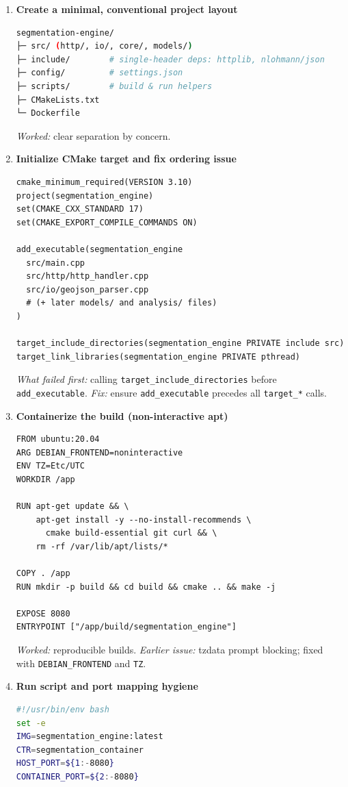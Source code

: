 \documentclass[11pt,twoside]{report}
\begin{document}
\begin{enumerate}
	\item \textbf{Create a minimal, conventional project layout}
	      \begin{lstlisting}[language=bash]
segmentation-engine/
├─ src/ (http/, io/, core/, models/)
├─ include/        # single-header deps: httplib, nlohmann/json
├─ config/         # settings.json
├─ scripts/        # build & run helpers
├─ CMakeLists.txt
└─ Dockerfile
    \end{lstlisting}
	      \subitem \textit{Worked:} clear separation by concern.

	\item \textbf{Initialize CMake target and fix ordering issue}
	      \begin{lstlisting}
cmake_minimum_required(VERSION 3.10)
project(segmentation_engine)
set(CMAKE_CXX_STANDARD 17)
set(CMAKE_EXPORT_COMPILE_COMMANDS ON)

add_executable(segmentation_engine
  src/main.cpp
  src/http/http_handler.cpp
  src/io/geojson_parser.cpp
  # (+ later models/ and analysis/ files)
)

target_include_directories(segmentation_engine PRIVATE include src)
target_link_libraries(segmentation_engine PRIVATE pthread)
    \end{lstlisting}
	      \subitem \textit{What failed first:} calling \texttt{target\_include\_directories} before \texttt{add\_executable}.
	      \subitem \textit{Fix:} ensure \texttt{add\_executable} precedes all \texttt{target\_*} calls.

	\item \textbf{Containerize the build (non-interactive apt)}
	      \begin{lstlisting}
FROM ubuntu:20.04
ARG DEBIAN_FRONTEND=noninteractive
ENV TZ=Etc/UTC
WORKDIR /app

RUN apt-get update && \
    apt-get install -y --no-install-recommends \
      cmake build-essential git curl && \
    rm -rf /var/lib/apt/lists/*

COPY . /app
RUN mkdir -p build && cd build && cmake .. && make -j

EXPOSE 8080
ENTRYPOINT ["/app/build/segmentation_engine"]
    \end{lstlisting}
	      \subitem \textit{Worked:} reproducible builds.
	      \subitem \textit{Earlier issue:} tzdata prompt blocking; fixed with \texttt{DEBIAN\_FRONTEND} and \texttt{TZ}.

	\item \textbf{Run script and port mapping hygiene}
	      \begin{lstlisting}[language=bash]
#!/usr/bin/env bash
set -e
IMG=segmentation_engine:latest
CTR=segmentation_container
HOST_PORT=${1:-8080}
CONTAINER_PORT=${2:-8080}


\end{lstlisting}
\end{enumerate}
\end{document}
